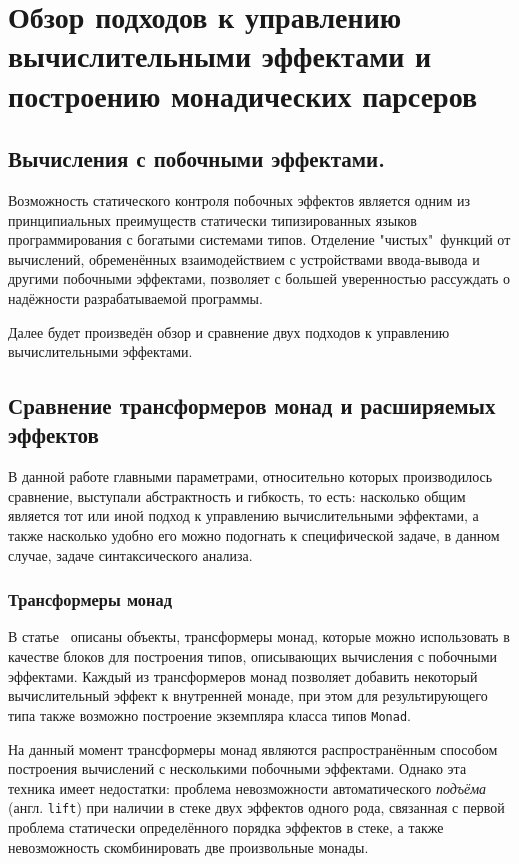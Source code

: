 \chapter{Обзор подходов к управлению вычислительными эффектами и построению
монадических парсеров}

\section{Вычисления с побочными эффектами. }

  Возможность статического контроля побочных эффектов является одним из принципиальных 
  преимуществ статически типизированных языков программирования с богатыми системами типов. 
  Отделение "чистых"~функций от вычислений, обременённых взаимодействием с 
  устройствами ввода-вывода и другими побочными эффектами, позволяет с большей
  уверенностью рассуждать о надёжности разрабатываемой программы. 

  Далее будет произведён обзор и сравнение двух подходов к управлению вычислительными 
  эффектами.   

\section{Сравнение трансформеров монад и расширяемых эффектов}

  В данной работе главными параметрами, относительно которых производилось сравнение, 
  выступали абстрактность и гибкость, то есть: насколько общим является тот или иной подход к управлению вычислительными эффектами, а также насколько удобно его можно подогнать к 
  специфической задаче, в данном случае, задаче синтаксического анализа.  

  \subsection{Трансформеры монад}

    В статье~\cite{monadTransformers} описаны объекты, трансформеры монад,
    которые можно использовать в качестве блоков для построения типов, описывающих
    вычисления с побочными эффектами. Каждый из трансформеров монад позволяет
    добавить некоторый вычислительный эффект к внутренней монаде, при
    этом для результирующего типа также возможно построение экземпляра класса
    типов \lstinline{Monad}.

    На данный момент трансформеры монад являются распространённым способом
    построения вычислений с несколькими побочными эффектами. Однако эта
    техника имеет недостатки: проблема невозможности автоматического
    \emph{подъёма} (англ. \lstinline{lift}) при наличии в стеке двух эффектов одного
    рода, связанная с первой проблема статически определённого порядка эффектов в
    стеке, а также невозможность скомбинировать две произвольные монады.

